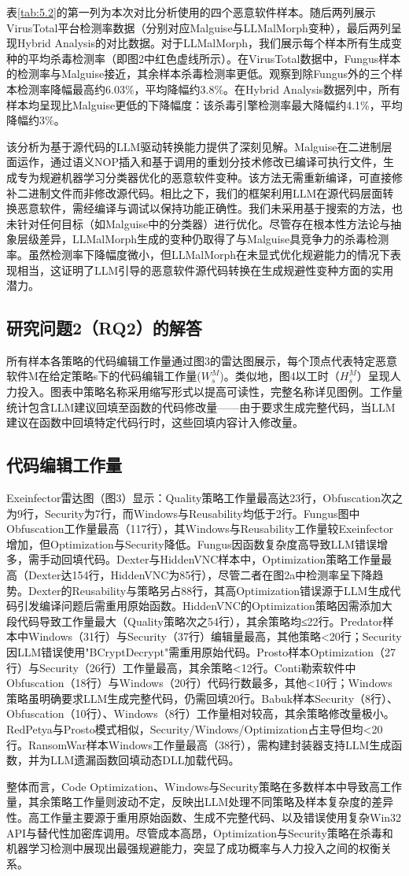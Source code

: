 表\ref{tab:5.2}的第一列为本次对比分析使用的四个恶意软件样本。随后两列展示VirusTotal平台检测率数据（分别对应Malguise与LLMalMorph变种），最后两列呈现Hybrid Analysis的对比数据。对于LLMalMorph，我们展示每个样本所有生成变种的平均杀毒检测率（即图2中红色虚线所示）。在VirusTotal数据中，Fungus样本的检测率与Malguise接近，其余样本杀毒检测率更低。观察到除Fungus外的三个样本检测率降幅最高约6.03\%，平均降幅约3.8\%。在Hybrid Analysis数据列中，所有样本均呈现比Malguise更低的下降幅度：该杀毒引擎检测率最大降幅约4.1\%，平均降幅约3\%。

该分析为基于源代码的LLM驱动转换能力提供了深刻见解。Malguise在二进制层面运作，通过语义NOP插入和基于调用的重划分技术修改已编译可执行文件，生成专为规避机器学习分类器优化的恶意软件变种。该方法无需重新编译，可直接修补二进制文件而非修改源代码。相比之下，我们的框架利用LLM在源代码层面转换恶意软件，需经编译与调试以保持功能正确性。我们未采用基于搜索的方法，也未针对任何目标（如Malguise中的分类器）进行优化。尽管存在根本性方法论与抽象层级差异，LLMalMorph生成的变种仍取得了与Malguise具竞争力的杀毒检测率。虽然检测率下降幅度微小，但LLMalMorph在未显式优化规避能力的情况下表现相当，这证明了LLM引导的恶意软件源代码转换在生成规避性变种方面的实用潜力。

\subsection{研究问题2（RQ2）的解答}
所有样本各策略的代码编辑工作量通过图3的雷达图展示，每个顶点代表特定恶意软件M在给定策略s下的代码编辑工作量($W_{s}^{M}$)。类似地，图4以工时（$H_{s}^{M}$）呈现人力投入。图表中策略名称采用缩写形式以提高可读性，完整名称详见图例。工作量统计包含LLM建议回填至函数的代码修改量——由于要求生成完整代码，当LLM建议在函数中回填特定代码行时，这些回填内容计入修改量。

\subsection{代码编辑工作量}
Exeinfector雷达图（图3）显示：Quality策略工作量最高达23行，Obfuscation次之为9行，Security为7行，而Windows与Reusability均低于2行。Fungus图中Obfuscation工作量最高（117行），其Windows与Reusability工作量较Exeinfector增加，但Optimization与Security降低。Fungus因函数复杂度高导致LLM错误增多，需手动回填代码。Dexter与HiddenVNC样本中，Optimization策略工作量最高（Dexter达154行，HiddenVNC为85行），尽管二者在图2a中检测率呈下降趋势。Dexter的Reusability与策略另占88行，其高Optimization错误源于LLM生成代码引发编译问题后需重用原始函数。HiddenVNC的Optimization策略因需添加大段代码导致工作量最大（Quality策略次之54行），其余策略均≤22行。Predator样本中Windows（31行）与Security（37行）编辑量最高，其他策略<20行；Security因LLM错误使用"BCryptDecrypt"需重用原始代码。Prosto样本Optimization（27行）与Security（26行）工作量最高，其余策略<12行。Conti勒索软件中Obfuscation（18行）与Windows（20行）代码行数最多，其他<10行；Windows策略虽明确要求LLM生成完整代码，仍需回填20行。Babuk样本Security（8行）、Obfuscation（10行）、Windows（8行）工作量相对较高，其余策略修改量极小。RedPetya与Prosto模式相似，Security/Windows/Optimization占主导但均<20行。RansomWar样本Windows工作量最高（38行），需构建封装器支持LLM生成函数，并为LLM遗漏函数回填动态DLL加载代码。

整体而言，Code Optimization、Windows与Security策略在多数样本中导致高工作量，其余策略工作量则波动不定，反映出LLM处理不同策略及样本复杂度的差异性。高工作量主要源于重用原始函数、生成不完整代码、以及错误使用复杂Win32 API与替代性加密库调用。尽管成本高昂，Optimization与Security策略在杀毒和机器学习检测中展现出最强规避能力，突显了成功概率与人力投入之间的权衡关系。